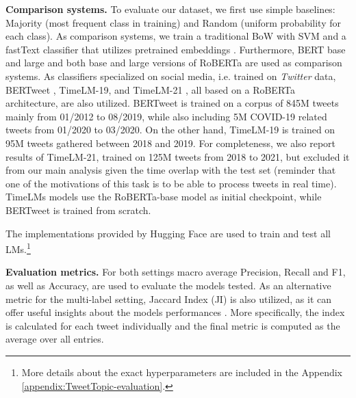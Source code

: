 \noindent \textbf{Comparison systems.} To evaluate our dataset, we first use simple baselines: Majority (most frequent class in training) and Random (uniform probability for each class). As comparison systems, we train a traditional \ac{BoW} with SVM
and a fastText classifier \cite{bojanowski2017enriching} that utilizes pretrained embeddings \cite{mikolov2018advances}. Furthermore, BERT base and large \cite{BERT} and both base and large versions of RoBERTa \cite{ROBERTA} are used as comparison systems. As classifiers specialized on social media, i.e. trained on \textit{Twitter} data, BERTweet \cite{bertweet}, TimeLM-19, and TimeLM-21 \cite{loureiro-etal-2022-timelms}, all based on a RoBERTa architecture, are also utilized. BERTweet is trained on a corpus of 845M tweets mainly from 01/2012 to 08/2019, while also including 5M COVID-19 related tweets from 01/2020 to 03/2020. On the other hand, TimeLM-19 is trained on 95M tweets gathered between 2018 and 2019. For completeness, we also report results of TimeLM-21, trained on 125M tweets from 2018 to 2021, but excluded it from our main analysis given the time overlap with the test set (reminder that one of the motivations of this task is to be able to process tweets in real time). TimeLMs models use the RoBERTa-base model as initial checkpoint, while BERTweet is trained from scratch. 

The implementations provided by Hugging Face \cite{wolf2019huggingface} are used to train and test all \acp{LM}.\footnote{More details about the exact hyperparameters are included in the Appendix \ref{appendix:TweetTopic-evaluation}.}

\noindent \textbf{Evaluation metrics.} For both settings macro average Precision, Recall and F1, as well as Accuracy, are used to evaluate the models tested. As an alternative  metric for the multi-label setting, Jaccard Index (JI) is also utilized, as it can offer useful insights about the models performances \cite{pereira2018correlation,tsoumakas2009mining}. More specifically, the index is calculated for each tweet individually and the final metric is computed as the average over all entries. 

